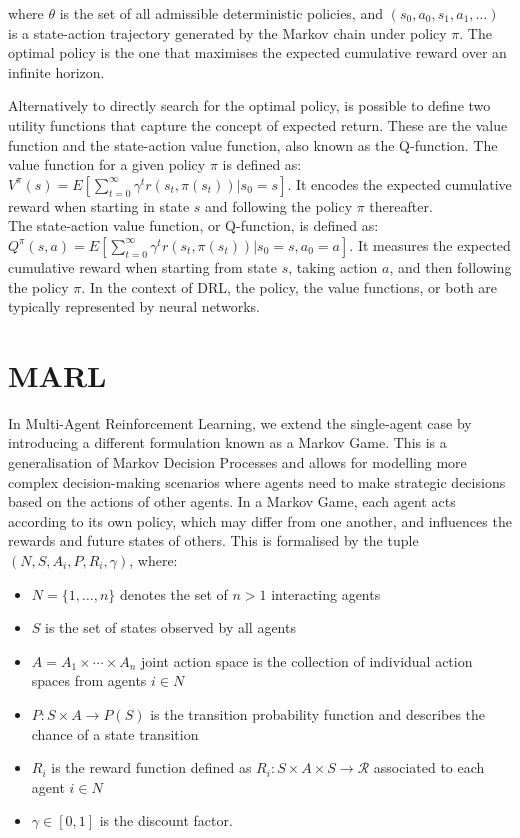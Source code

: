 \documentclass[a4paper,singleside,12pt]{report} %
\begin{document}
where \(\theta\) is the set of all admissible deterministic policies, and \((s_0, a_0, s_1, a_1, \dots)\) is a state-action trajectory generated by the Markov chain under policy \(\pi\). The optimal policy is the one that maximises the expected cumulative reward over an infinite horizon.

Alternatively to directly search for the optimal policy, is possible to define two utility functions that capture the concept of expected return. These are the value function and the state-action value function, also known as the Q-function. The value function for a given policy \(\pi\) is defined as:\\
${V^{\pi}(s) = E [\sum_{t=0}^{\infty} \gamma^tr(s_t, \pi(s_t))|s_0 = s]}$.
It encodes the expected cumulative reward when starting in state \(s\) and following the policy \(\pi\) thereafter.\\
The state-action value function, or Q-function, is defined as: \\
${Q^{\pi}(s, a) = E [\sum_{t=0}^{\infty} \gamma^tr(s_t, \pi(s_t))|s_0 = s, a_0 = a]}$.
It measures the expected cumulative reward when starting from state \(s\), taking action \(a\), and then following the policy \(\pi\). In the context of DRL, the policy, the value functions, or both are typically represented by neural networks.

\section{MARL}\label{marl}

In Multi-Agent Reinforcement Learning, we extend the single-agent case by introducing a different formulation known as a Markov Game. This is a generalisation of Markov Decision Processes and allows for modelling more complex decision-making scenarios where agents need to make strategic decisions based on the actions of other agents. In a Markov Game, each agent acts according to its own policy, which may differ from one another, and influences the rewards and future states of others. This is formalised by the tuple \((N, S, {A_i}, P, {R_i}, \gamma)\), where:

\begin{itemize}
\item
  \(N = \{1, \dots, n\}\) denotes the set of \(n > 1\) interacting agents
\item
  \(S\) is the set of states observed by all agents
\item
  \(A = A_1 \times \cdots \times A_n\) joint action space is the
  collection of individual action spaces from agents \(i \in N\)
\item
  \(P: S \times A \rightarrow P(S)\) is the transition probability
  function and describes the chance of a state transition
\item
  \(R_i\) is the reward function defined as
  \(R_i: S \times A \times S \rightarrow \mathcal{R}\) associated to each
  agent \(i \in N\)
\item
  \(\gamma \in [0,1]\) is the discount factor.
\end{itemize}
\end{document}
